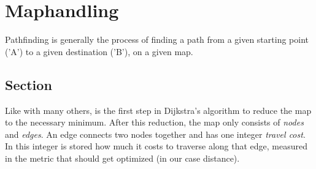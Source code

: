 \chapter{Maphandling}\label{ch:map}
Pathfinding is generally the process of finding a path from a given starting point ('A')
to a given destination ('B'),
on a given map.

\section{Section}\label{sec:sec}
Like with many others,
is the first step in Dijkstra's algorithm to reduce the map to the necessary minimum.
After this reduction, the map only consists of \emph{nodes} and \emph{edges}.
An edge connects two nodes together and has one integer \emph{travel cost}.
In this integer is stored how much it costs to traverse along that edge,
measured in the metric that should get optimized (in our case distance).
